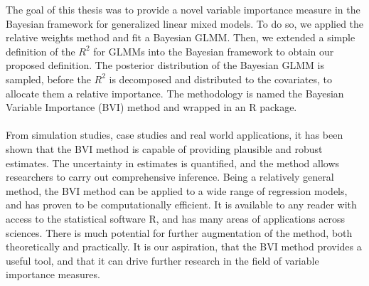 The goal of this thesis was to provide a novel variable importance measure in the Bayesian framework for generalized linear mixed models. To do so, we applied the relative weights method and fit a Bayesian GLMM. Then, we extended a simple definition of the $R^2$ for GLMMs into the Bayesian framework to obtain our proposed definition. The posterior distribution of the Bayesian GLMM is sampled, before the $R^2$ is decomposed and distributed to the covariates, to allocate them a relative importance. The methodology is named the Bayesian Variable Importance (BVI) method and wrapped in an R package. 
\\
\\
From simulation studies, case studies and real world applications, it has been shown that the BVI method is capable of providing plausible and robust estimates. The uncertainty in estimates is quantified, and the method allows researchers to carry out comprehensive inference. Being a relatively general method, the BVI method can be applied to a wide range of regression models, and has proven to be computationally efficient. It is available to any reader with access to the statistical software R, and has many areas of applications across sciences. There is much potential for further augmentation of the method, both theoretically and practically. It is our aspiration, that the BVI method provides a useful tool, and that it can drive further research in the field of variable importance measures.